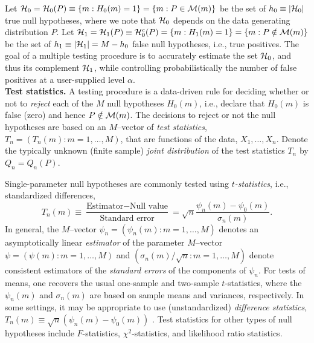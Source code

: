 \documentclass[11pt]{article}
\begin{document}
 Let ${\cal H}_0={\cal H}_0(P)\equiv \{m:H_0(m)=1\} = \{m: P \in {\cal M}(m)\}$ be the set of $h_0 \equiv |{\cal H}_0|$ true null hypotheses, where we note that ${\cal H}_0$ depends on the data generating distribution $P$. Let ${\cal H}_1={\cal H}_1(P) \equiv {\cal H}_0^c(P) = \{m: H_1(m) = 1\} = \{m: P \notin {\cal M}(m)\}$
be the set of  $h_1 \equiv |{\cal H}_1|  = M-h_0$ false null hypotheses, i.e., true positives.  
The goal of a multiple testing
  procedure is to accurately estimate the set ${\cal H}_0$, and thus its
  complement ${\cal H}_1$, while controlling probabilistically the number
  of false positives at a user-supplied level $\alpha$.\\

\noindent
{\bf Test statistics.} A testing procedure is a data-driven rule for deciding whether or not to {\em reject}  each of the $M$ null hypotheses $H_0(m)$, i.e., declare that $H_0(m)$ is false (zero) and hence $P \notin {\cal M}(m)$. 
The decisions to reject or not the null hypotheses are based on an $M$--vector of
{\em test statistics}, $T_n
  =(T_n(m):m=1,\ldots,M)$, that are functions of the
data, $X_1, \ldots, X_n$. Denote the typically unknown (finite sample) {\em joint distribution} of the test statistics $T_n$ by $Q_n=Q_n(P)$. 


Single-parameter null hypotheses are commonly tested using {\em $t$-statistics}, i.e., standardized differences,
\begin{equation}\label{anal:mult:e:tstat}
T_n(m) \equiv \frac{\mbox{Estimator} - \mbox{Null value}}{\mbox{Standard error}} = \sqrt{n}\frac{\psi_n(m) - \psi_0(m)}{{\sigma_n(m)}}.
\end{equation}
In general, the $M$--vector $\psi_n = (\psi_n(m): m=1,\ldots, M)$ denotes an asymptotically linear {\em estimator} of the parameter $M$--vector $\psi = (\psi(m): m=1,\ldots,M)$ and $(\sigma_n(m)/\sqrt{n}:
m=1,\ldots, M)$ denote consistent estimators of the {\em standard errors} of the components of $\psi_n$. 
For tests of means, one recovers the usual one-sample and two-sample $t$-statistics, where the $\psi_n(m)$ and $\sigma_n(m)$ are based on sample means and variances, respectively.
In some settings, it may be appropriate to use (unstandardized) {\em difference statistics}, $T_n(m) \equiv \sqrt{n}(\psi_n(m) - \psi_0(m))$ \cite{Pollard&vdLaanJSPI04}.
Test statistics for other types of null hypotheses include $F$-statistics, $\chi^2$-statistics, and likelihood ratio statistics. \\
\end{document}
